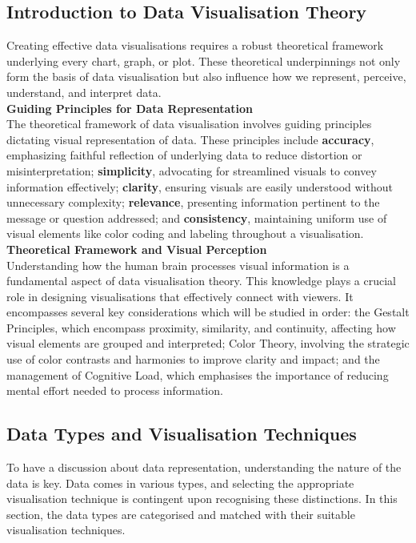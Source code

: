 \documentclass{article}\usepackage[]{graphicx}\usepackage[]{xcolor}
\begin{document}
\subsection{Introduction to Data Visualisation Theory}
Creating effective data visualisations requires a robust theoretical framework underlying every chart, graph, or plot. These theoretical underpinnings not only form the basis of data visualisation but also influence how we represent, perceive, understand, and interpret data.\\ 

\noindent \textbf{Guiding Principles for Data Representation}\\
The theoretical framework of data visualisation involves guiding principles dictating visual representation of data. These principles include \textbf{accuracy}, emphasizing faithful reflection of underlying data to reduce distortion or misinterpretation; \textbf{simplicity}, advocating for streamlined visuals to convey information effectively; \textbf{clarity}, ensuring visuals are easily understood without unnecessary complexity; \textbf{relevance}, presenting information pertinent to the message or question addressed; and \textbf{consistency}, maintaining uniform use of visual elements like color coding and labeling throughout a visualisation.\\

\noindent \textbf{Theoretical Framework and Visual Perception}\\
Understanding how the human brain processes visual information is a fundamental aspect of data visualisation theory. This knowledge plays a crucial role in designing visualisations that effectively connect with viewers. It encompasses several key considerations which will be studied in order: the Gestalt Principles, which encompass proximity, similarity, and continuity, affecting how visual elements are grouped and interpreted; Color Theory, involving the strategic use of color contrasts and harmonies to improve clarity and impact; and the management of Cognitive Load, which emphasises the importance of reducing mental effort needed to process information.\\

\subsection{Data Types and Visualisation Techniques}
To have a discussion about data representation, understanding the nature of the data is key. Data comes in various types, and selecting the appropriate visualisation technique is contingent upon recognising these distinctions. In this section, the data types are categorised and matched with their suitable visualisation techniques.
\end{document}

